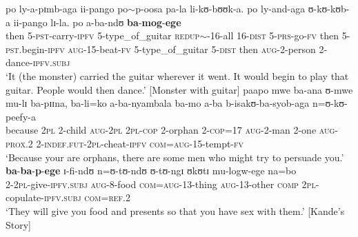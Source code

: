 \begin{exe}
\ex \label{exPSTIPFVSUBJIPFV} \gll po ly-a-pɪmb-aga ii-pango po$\sim$p-oosa pa-la li-kʊ-bʊʊk-a. po ly-and-aga ʊ-kʊ-kʊb-a ii-pango lɪ-la. po a-ba-ndʊ \textbf{ba}-\textbf{mog}-\textbf{ege}\\
then 5-\textsc{pst}-carry-\textsc{ipfv} 5-type\_of\_guitar \textsc{redup}$\sim$-16-all 16-\textsc{dist} 5-\textsc{prs}-go-\textsc{fv} then 5-\textsc{pst}.begin-\textsc{ipfv} \textsc{aug}-15-beat-\textsc{fv} 5-type\_of\_guitar 5-\textsc{dist} then \textsc{aug}-2-person 2-dance-\textsc{ipfv.subj}\\
\glt \lq It (the monster) carried the guitar wherever it went. It would begin to play that guitar. People would then dance.' [Monster with guitar]
\ex \label{exFuturateSUBJIPFV} 
\gll paapo mwe ba-ana ʊ-mwe mu-lɪ ba-pɪɪna, ba-li=ko a-ba-nyambala ba-mo a-ba b-isakʊ-ba-syob-aga n=ʊ-kʊ-peefy-a\\
because \textsc{2pl} 2-child \textsc{aug}-\textsc{2pl} \textsc{2pl}-\textsc{cop} 2-orphan 2-\textsc{cop}=17 \textsc{aug}-2-man 2-one \textsc{aug}-\textsc{prox.2} 2-\textsc{indef.fut}-\textsc{2pl}-cheat-\textsc{ipfv} \textsc{com}=\textsc{aug}-15-tempt-\textsc{fv}\\
\glt \lq Because your are orphans, there are some men who might try to persuade you.'
\sn \gll \textbf{ba}-\textbf{ba}-\textbf{p}-\textbf{ege} ɪ-fi-ndʊ n=ʊ-tʊ-ndʊ ʊ-tʊ-ngɪ ʊkʊtɪ mu-logw-ege na=bo\\
2-\textsc{2pl}-give-\textsc{ipfv.subj} \textsc{aug}-8-food \textsc{com}=\textsc{aug}-13-thing \textsc{aug}-13-other \textsc{comp} \textsc{2pl}-copulate-\textsc{ipfv.subj} \textsc{com}=\textsc{ref.2}\\
\glt \lq They will give you food and presents so that you have sex with them.' [Kande's Story]\footnotemark
\protect{}
\end{exe}


